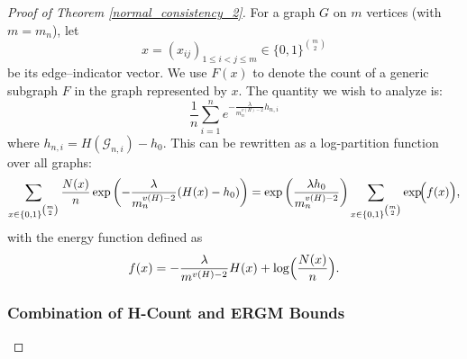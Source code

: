 \documentclass[12pt]{article}
\numberwithin{equation}{section}
\begin{document}
\begin{proof}[Proof of Theorem \ref{normal_consistency_2}]
For a graph \(G\) on \(m\) vertices (with \(m=m_n\)), let
\[
x=(x_{ij})_{1\le i<j\le m}\in\{0,1\}^{\binom{m}{2}}
\]
be its edge–indicator vector. We use $F(x)$ to denote the count of a generic subgraph $F$ in the graph represented by $x$. The quantity we wish to analyze is:
\[
\frac{1}{n}\sum_{i=1}^n e^{-\frac{\lambda}{m_n^{v(H)-2}} h_{n,i}}
\]
where $h_{n,i} = H(\mathcal{G}_{n,i}) - h_0$. This can be rewritten as a log-partition function over all graphs:
\[
\sum_{x\in\{0,1\}^{\binom{m}{2}}} \frac{N(x)}{n} \exp\left(-\frac{\lambda}{m_n^{v(H)-2}} (H(x)-h_0)\right) = \exp\left(\frac{\lambda h_0}{m_n^{v(H)-2}}\right) \sum_{x\in\{0,1\}^{\binom{m}{2}}}\exp\!\Bigl(f(x)\Bigr),
\]
with the energy function defined as
\begin{equation}
\label{eq:f_def_gen}
f(x) = -\frac{\lambda}{m^{v(H)-2}} H(x) + \log\Bigl(\frac{N(x)}{n}\Bigr).
\end{equation}

\subsubsection*{Combination of H-Count and ERGM Bounds}


\end{proof}
\end{document}
